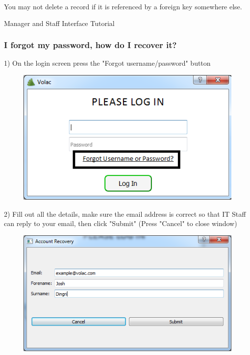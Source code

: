 You may not delete a record if it is referenced by a foreign key somewhere else.

Manager and Staff Interface Tutorial

\subsubsection{I forgot my password, how do I recover it?}

1) On the login screen press the "Forgot username/password" button

\begin{figure}[H]
    \includegraphics[width=\textwidth]{./Manual/Images/forgot.png}
\end{figure}

2) Fill out all the details, make sure the email address is correct so that IT Staff can reply to your email, then click "Submit" (Press "Cancel" to close window)

\begin{figure}[H]
    \includegraphics[width=\textwidth]{./Manual/Images/forgot2.png}
\end{figure}

